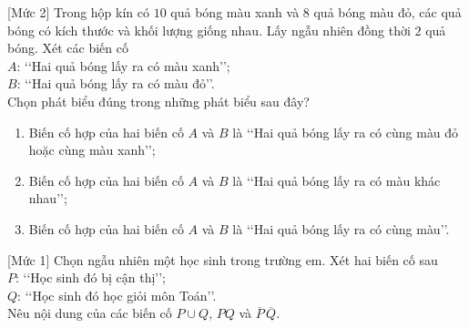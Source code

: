 \begin{bt}%
[Mức 2]
	Trong hộp kín có $10$ quả bóng màu xanh và $8$ quả bóng màu đỏ, các quả bóng có kích thước và khối lượng giống nhau. Lấy ngẫu nhiên đồng thời $2$ quả bóng. Xét các biến cố\\
	$A$: \lq\lq Hai quả bóng lấy ra có màu xanh\rq\rq;\\
	$B$: \lq\lq Hai quả bóng lấy ra có màu đỏ\rq\rq.\\
	Chọn phát biểu đúng trong những phát biểu sau đây?
	\begin{enumerate}
		\item Biến cố hợp của hai biến cố $A$ và $B$ là \lq\lq Hai quả bóng lấy ra có cùng màu đỏ hoặc cùng màu xanh\rq\rq;
		\item Biến cố hợp của hai biến cố $A$ và $B$ là \lq\lq Hai quả bóng lấy ra có màu khác nhau\rq\rq;
		\item Biến cố hợp của hai biến cố $A$ và $B$ là \lq\lq Hai quả bóng lấy ra có cùng màu\rq\rq.
	\end{enumerate}
\end{bt}

\begin{bt}%
[Mức 1]
	Chọn ngẫu nhiên một học sinh trong trường em. Xét hai biến cố sau\\
	$P$: \lq\lq Học sinh đó bị cận thị\rq\rq;\\
	$Q$: \lq\lq Học sinh đó học giỏi môn Toán\rq\rq.\\
	Nêu nội dung của các biến cố $P \cup Q$, $PQ$ và $\overline{P}\,\overline{Q}$.
\end{bt}

